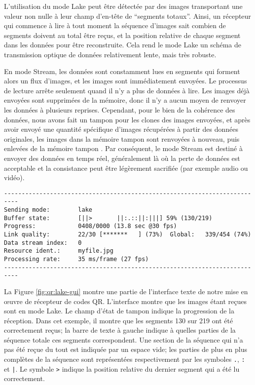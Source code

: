 L'utilisation du mode Lake peut être détectée par des images transportant une valeur non nulle à leur champ d'en-tête de ``segments totaux''. Ainsi, un récepteur qui commence à lire à tout moment la séquence d'images sait combien de segments doivent au total être reçus, et la position relative de chaque segment dans les données pour être reconstruite. Cela rend le mode Lake un schéma de transmission optique de données relativement lente, mais très robuste.

En mode Stream, les données sont constamment lues en segments qui forment alors un flux d'images, et les images sont immédiatement envoyées. Le processus de lecture arrête seulement quand il n'y a plus de données à lire. Les images déjà envoyées sont supprimées de la mémoire, donc il n'y a aucun moyen de renvoyer les données à plusieurs reprises. Cependant, pour le bien de la cohérence des données, nous avons fait un tampon pour les clones des images envoyées, et après avoir envoyé une quantité spécifique d'images récupérées à partir des données originales, les images dans la mémoire tampon sont renvoyées à nouveau, puis enlevées de la mémoire tampon . Par conséquent, le mode Stream est destiné à envoyer des données en temps réel, généralement là où la perte de données est acceptable et la consistance peut être légèrement sacrifiée (par exemple audio ou vidéo).

\begin{figure*}
\centering
\begin{verbatim}
--------------------------------------------------------------------------
Sending mode:        lake
Buffer state:        [||>       ||:.::||:|||] 59% (130/219)
Progress:            0408/0000 (13.8 sec @30 fps)
Link quality:        22/30 [*******   ] (73%)  Global:   339/454 (74%)
Data stream index:   0
Resource ident.:     myfile.jpg
Processing rate:     35 ms/frame (27 fps)
--------------------------------------------------------------------------
\end{verbatim}
\caption{Une partie de l'interface texte du récepteur de codes QR qui fonctionne en mode Lake}
\label{fig:qr:lake-gui}
\end{figure*}

La Figure \ref{fig:qr:lake-gui} montre une partie de l'interface texte de notre mise en œuvre de récepteur de codes QR. L'interface montre que les images étant reçues sont en mode Lake. Le champ d'état de tampon indique la progression de la réception. Dans cet exemple, il montre que les segments 130 sur 219 ont été correctement reçus; la barre de texte à gauche indique à quelles parties de la séquence totale ces segments correspondent. Une section de la séquence qui n'a pas été reçue du tout est indiquée par un espace vide; les parties de plus en plus complètes de la séquence sont représentées respectivement par les symboles \verb+.+, \verb+:+ et \verb+|+. Le symbole \verb+>+ indique la position relative du dernier segment qui a été lu correctement.

